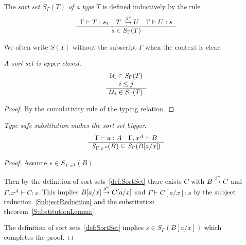 \begin{definition}
    \label{def:SortSet}
    The \emph{sort set $S_\Gamma(T)$ of a type $T$} is defined inductively by
    the rule
    $$
    \ruleh{
        \Gamma \vdash T : s_1\quad
        T \reducestar U\quad
        \Gamma \vdash U : s
    }
    {
        s \in S_\Gamma(T)
    }
    $$

    We often write $S(T)$ without the subscript $\Gamma$ when the context is
    clear.
\end{definition}





\begin{theorem}
    \label{thm:SortSetUpperClosed}
    \emph{A sort set is upper closed}.
    $$
        \begin{array}{c} 
            {\cal U}_i \in S_\Gamma(T)
            \\
            i \le j
         \\ \hline 
            {\cal U}_j \in S_\Gamma(T)
        \end{array}
    $$
    \begin{proof}
        By the cumulativity rule of the typing relation.
    \end{proof}
\end{theorem}






\begin{theorem}
    \label{thm:SortSetSubstitution}
    \emph{Type safe substitution makes the sort set bigger}.
    $$
        \begin{array}{c} 
            \Gamma \vdash a : A \quad \Gamma,x^A \vdash B
         \\ \hline 
            S_{\Gamma,x^A}(B) \subseteq S_\Gamma(B[a/x])
        \end{array}
    $$
    \begin{proof}
        Assume $s \in S_{\Gamma,x^A}(B)$.

        Then by the definition of sort sets~\ref{def:SortSet}
        there exists $C$ with $B \stackrel{\beta^*}{\to} C$ and $\Gamma,x^A \vdash C: s$.
        This implies $B[a/x] \stackrel{\beta^*}{\to} C[a/x]$ and $\Gamma \vdash C[a/x] : s$
        by the subject reduction~\ref{SubjectReduction} and the substitution
        theorem~\ref{SubstitutionLemma}.

        The definition of sort sets~\ref{def:SortSet} implies $s \in
        S_\Gamma(B[a/x])$ which completes the proof.
    \end{proof}
\end{theorem}






